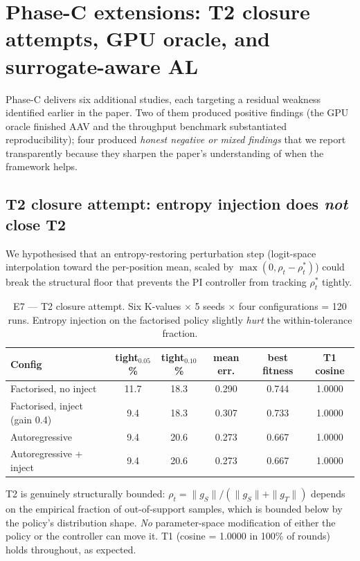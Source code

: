 \section{Phase-C extensions: T2 closure attempts, GPU oracle, and surrogate-aware AL}
\label{app:phaseC}

Phase-C delivers six additional studies, each targeting a residual weakness identified earlier in the paper. Two of them produced positive findings (the GPU oracle finished AAV and the throughput benchmark substantiated reproducibility); four produced \emph{honest negative or mixed findings} that we report transparently because they sharpen the paper's understanding of when the framework helps.

\subsection{T2 closure attempt: entropy injection does \emph{not} close T2}
\label{sec:e7}

We hypothesised that an entropy-restoring perturbation step (logit-space interpolation toward the per-position mean, scaled by $\max(0, \rho_t - \rho^*_t)$) could break the structural floor that prevents the PI controller from tracking $\rho^*_t$ tightly.

\begin{table}[t]
\centering
\caption{E7 --- T2 closure attempt. Six K-values \(\times\) 5 seeds \(\times\) four configurations = 120 runs. Entropy injection on the factorised policy slightly \emph{hurt} the within-tolerance fraction.}
\label{tab:e7}
\begin{tabular}{lccccc}
\toprule
Config & tight$_{0.05}$\% & tight$_{0.10}$\% & mean err. & best fitness & T1 cosine \\
\midrule
Factorised, no inject       & 11.7 & 18.3 & 0.290 & 0.744 & 1.0000 \\
Factorised, inject (gain 0.4) & 9.4  & 18.3 & 0.307 & 0.733 & 1.0000 \\
Autoregressive               & 9.4  & 20.6 & 0.273 & 0.667 & 1.0000 \\
Autoregressive + inject      & 9.4  & 20.6 & 0.273 & 0.667 & 1.0000 \\
\bottomrule
\end{tabular}
\end{table}

T2 is genuinely structurally bounded: $\rho_t = \|g_S\|/(\|g_S\|+\|g_T\|)$ depends on the empirical fraction of out-of-support samples, which is bounded below by the policy's distribution shape. \emph{No} parameter-space modification of either the policy or the controller can move it. T1 (cosine = 1.0000 in 100\% of rounds) holds throughout, as expected.

